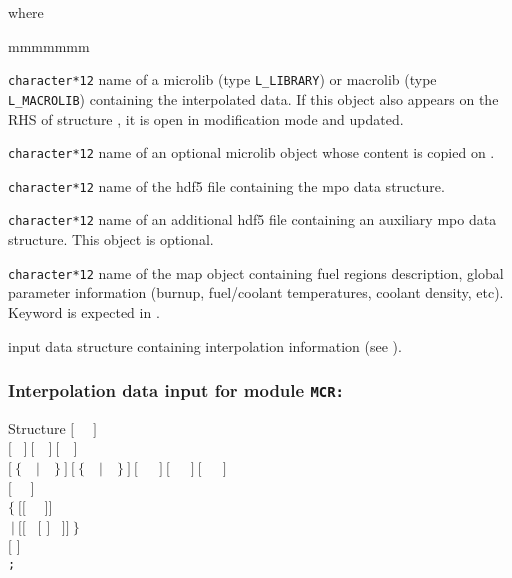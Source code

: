 \noindent where
\begin{ListeDeDescription}{mmmmmmm}

\item[\dusa{MLIB}] {\tt character*12} name of a {\sc microlib} (type {\tt L\_LIBRARY}) or {\sc macrolib} (type {\tt L\_MACROLIB}) containing the interpolated data.
If this object also appears on the RHS of structure , it is open in modification mode and updated.

\item[\dusa{MLIB2}] {\tt character*12} name of an optional {\sc microlib} object whose content is copied on .

\item[\dusa{MPONAM1}] {\tt character*12} name of the {\sc hdf5} file containing the {\sc mpo} data structure.

\item[\dusa{MPONAM2}] {\tt character*12} name of an additional {\sc hdf5} file containing an auxiliary
{\sc mpo} data structure. This object is optional.

\item[\dusa{MAPFL}] {\tt character*12} name of the {\sc map} object containing fuel regions description, global parameter
information (burnup, fuel/coolant temperatures, coolant density, etc). Keyword  is expected in .

\item[\dusa{mcr\_data}] input data structure containing interpolation information (see ).

\end{ListeDeDescription}

\subsubsection{Interpolation data input for module {\tt MCR:}}\label{sect:descmcr}

\vskip -0.5cm

\begin{DataStructure}{Structure }
$[$~ ~$]$ \\
$[$~ $]~[$~~$]~[$~~$]$ \\
$[~\{$~~$|$~~$\}~]~[~\{$~~$|$~~$\}~]~[$~~~$]~[$~~~$]~[$~~~$]$  \\
$[$~ ~$]$ \\
$\{~[[$~   ~$]]$ \\
$~|~[[$~   $[$  $]$  ~$]]~\}$ \\
$[$  $]$ \\
{\tt ;}
\end{DataStructure}

